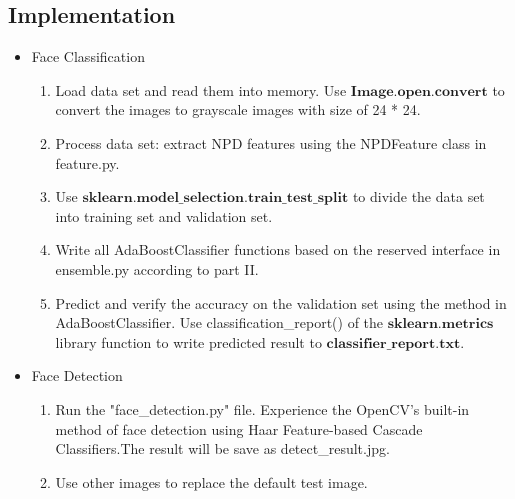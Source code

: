 \documentclass[journal, a4paper]{IEEEtran}
\begin{document}
\subsection{Implementation}
\begin{itemize}
	\item Face Classification
\begin{enumerate}
	\item Load data set and read them into memory. Use $\boldsymbol{Image.open.convert}$ to convert the images to grayscale images with size of 24 * 24.
	\item Process data set: extract NPD features using the NPDFeature class in feature.py. 
	\item Use $\boldsymbol{sklearn.model\_selection.train\_test\_split}$ to divide the data set into training set and validation set.
	\item Write all AdaBoostClassifier functions based on the reserved interface in ensemble.py according to part II.
	\item Predict and verify the accuracy on the validation set using the method in AdaBoostClassifier. Use classification\_report() of the $\boldsymbol{sklearn.metrics}$ library function to write predicted result to $\boldsymbol{classifier\_report.txt}$.
\end{enumerate}
   \item Face Detection
   \begin{enumerate}
   	\item Run the "face\_detection.py" file. Experience the OpenCV's built-in method of face detection using Haar Feature-based Cascade Classifiers.The result will be save as detect\_result.jpg.
   	\item Use other images to replace the default test image.
   \end{enumerate}
\end{itemize}

\end{document}
